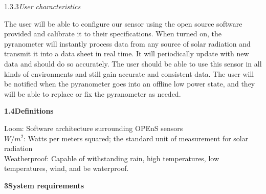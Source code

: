 \documentclass[10pt,draftclsnofoot,onecolumn,letterpaper]{article}
\begin{document}
{\fontsize{10pt}{12.0pt} 1.3.3\quad \textit{User characteristics}\\\selectfont 
\par}\par
{\fontsize{10pt}{12.0pt} The user will be able to configure our sensor using the open source software provided and calibrate it to their specifications. When turned on, the pyranometer will instantly process data from any source of solar radiation and transmit it into a data sheet in real time. It will periodically update with new data and should do so accurately. The user should be able to use this sensor in all kinds of environments and still gain accurate and consistent data. The user will be notified when the pyranometer goes into an offline low power state, and they will be able to replace or fix the pyranometer as needed. \\\selectfont 
\par}\par

{\fontsize{10pt}{12.0pt} \textbf{1.4\quad Definitions}\\\selectfont 
\par}\par
{\fontsize{10pt}{12.0pt} Loom: Software architecture surrounding OPEnS sensors\\$W/m^2$: Watts per meters squared; the standard unit of measurement for solar radiation\\Weatherproof: Capable of withstanding rain, high temperatures, low temperatures, wind, and be waterproof.\\ \selectfont
\par}\par

{\fontsize{12pt}{12.0pt} \textbf{3\quad System requirements}\\\selectfont 
\par}\par
\end{document}
